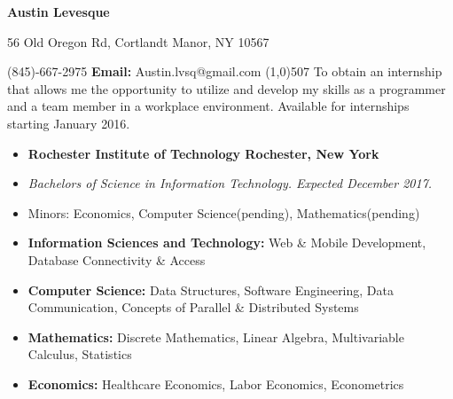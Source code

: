 \documentclass[10pt]{article}
\begin{document}
\centerline{\Large \bf Austin Levesque}
\vspace{.5ex}
\centerline{56 Old Oregon Rd, Cortlandt Manor, NY 10567}
\vspace{1ex}
 (845)-667-2975 \hfill {\bf Email:} Austin.lvsq@gmail.com
\line(1,0){507}
\vspace{2ex}
To obtain an internship that allows me the opportunity to utilize and develop my skills as a programmer and a team member in a workplace environment. Available for internships starting January 2016.
\vspace{1ex}\\
\begin{itemize}[topsep=1ex, itemsep=0ex, partopsep=0ex, parsep=0ex]
	\item[]{{\bf Rochester Institute of Technology \hfill Rochester, New York}}
  \item[]{\it Bachelors of Science in Information Technology. \hfill Expected December 2017.}
  \item[] Minors: Economics, Computer Science(pending), Mathematics(pending)
\end{itemize}
\vspace{1ex}
\begin{itemize}[topsep=0.5ex, itemsep=0ex, partopsep=0ex, parsep=1ex]
	\item[] {\bf Information Sciences and Technology:} Web \& Mobile Development, Database Connectivity \& Access
	\item[] {\bf Computer Science:} Data Structures, Software Engineering, Data Communication, Concepts of Parallel \& Distributed Systems
	\item[] {\bf Mathematics:} Discrete Mathematics, Linear Algebra, Multivariable Calculus, Statistics
	\item[] {\bf Economics:} Healthcare Economics, Labor Economics, Econometrics
\end{itemize}
\vspace{1ex}
\end{document}
